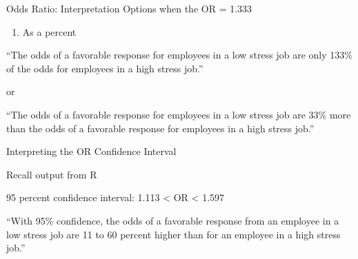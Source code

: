 \documentclass[12pt,ignorenonframetext,aspectratio=169]{beamer}
\def\tightlist{}
\begin{document}
\begin{frame}{Odds Ratio: Interpretation Options when the OR = 1.333}

\begin{enumerate}
\def\labelenumi{\arabic{enumi}.}
\setcounter{enumi}{1}
\tightlist
\item
  As a percent
\end{enumerate}

``The odds of a favorable response for employees in a low stress job are
only 133\% of the odds for employees in a high stress job.''

or

``The odds of a favorable response for employees in a low stress job are
33\% more than the odds of a favorable response for employees in a high
stress job.''


\end{frame}

\begin{frame}{Interpreting the OR Confidence Interval}

Recall output from R

95 percent confidence interval: 1.113 \textless{} OR \textless{} 1.597

``With 95\% confidence, the odds of a favorable response from an
employee in a low stress job are 11 to 60 percent higher than for an
employee in a high stress job.''


\end{frame}

\begin{frame}

\end{frame}


\providecommand{\tightlist}{%
  \setlength{\itemsep}{0pt}\setlength{\parskip}{0pt}}
\end{document}
